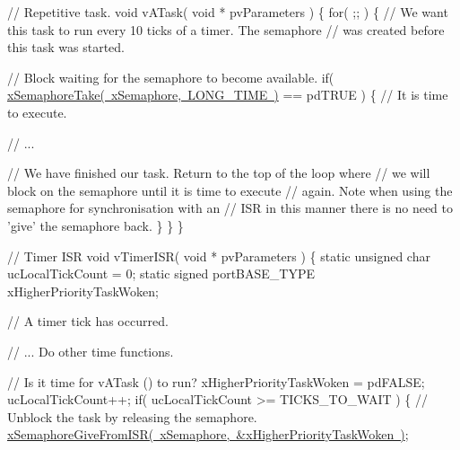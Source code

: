 \begin{DoxyPre}// Repetitive task.
void vATask( void * pvParameters )
\{
   for( ;; )
   \{
       // We want this task to run every 10 ticks of a timer.  The semaphore 
       // was created before this task was started.\end{DoxyPre}



\begin{DoxyPre}       // Block waiting for the semaphore to become available.
       if( \mbox{\hyperlink{semphr_8h_af116e436d2a5ae5bd72dbade2b5ea930}{xSemaphoreTake( xSemaphore, LONG\_TIME )}} == pdTRUE )
       \{
           // It is time to execute.\end{DoxyPre}



\begin{DoxyPre}           // ...\end{DoxyPre}



\begin{DoxyPre}           // We have finished our task.  Return to the top of the loop where
           // we will block on the semaphore until it is time to execute 
           // again.  Note when using the semaphore for synchronisation with an
        // ISR in this manner there is no need to 'give' the semaphore back.
       \}
   \}
\}\end{DoxyPre}



\begin{DoxyPre}// Timer ISR
void vTimerISR( void * pvParameters )
\{
static unsigned char ucLocalTickCount = 0;
static signed portBASE\_TYPE xHigherPriorityTaskWoken;\end{DoxyPre}



\begin{DoxyPre}   // A timer tick has occurred.\end{DoxyPre}



\begin{DoxyPre}   // ... Do other time functions.\end{DoxyPre}



\begin{DoxyPre}   // Is it time for vATask () to run?
   xHigherPriorityTaskWoken = pdFALSE;
   ucLocalTickCount++;
   if( ucLocalTickCount >= TICKS\_TO\_WAIT )
   \{
       // Unblock the task by releasing the semaphore.
       \mbox{\hyperlink{semphr_8h_a68aa43df8b2a0dbe17d05fad74670ef0}{xSemaphoreGiveFromISR( xSemaphore, &xHigherPriorityTaskWoken )}};\end{DoxyPre}



